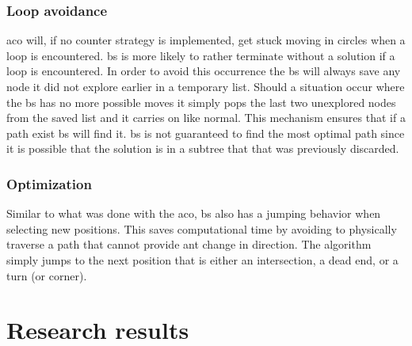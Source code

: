 \documentclass[hidelinks,english,conference]{IEEEtran}
\begin{document}
    \subsubsection{Loop avoidance\label{bsLoopAvoidance}}
	\gls{aco} will, if no counter strategy is implemented, get stuck moving in circles when  a loop is encountered. \gls{bs} is more likely to rather terminate without a solution if  a loop is encountered. In order to avoid this occurrence the \gls{bs} will always save any node it did not explore earlier in a temporary list.  Should a situation occur where the \gls{bs} has no more possible moves it simply pops the last two unexplored nodes from the saved list and it carries on like normal. This mechanism ensures that if a path exist \gls{bs} will find it. \gls{bs} is not guaranteed to find the most optimal path since it is possible that the solution is in a subtree that that was previously discarded. \\
    
    \subsubsection{Optimization\label{bsOptimizationSection}}
	Similar to what was done with the \gls{aco}, \gls{bs} also has a jumping behavior when selecting new positions. This saves computational time by avoiding to physically traverse a path that cannot provide ant change in direction. The algorithm simply jumps to the next position that is either an intersection, a dead end, or a turn (or corner).
    
    \section{Research results\label{researchResultsSection}}
\end{document}
